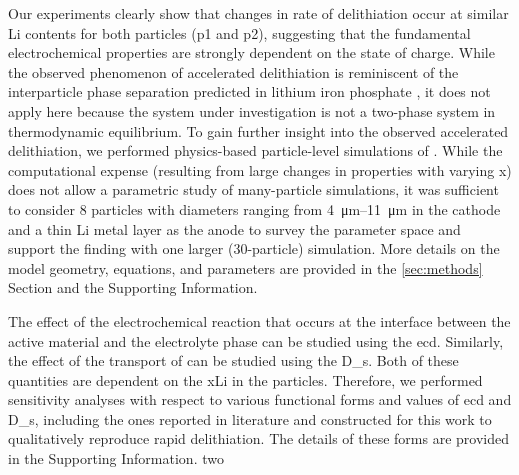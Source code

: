\documentclass{article}
\begin{document}
Our experiments clearly show that changes in rate of delithiation
occur at similar Li contents for both particles (\gls{p1} and
\gls{p2}), suggesting that the fundamental electrochemical properties
are strongly dependent on the state of charge. While the observed
phenomenon of accelerated delithiation is reminiscent of the
interparticle phase separation predicted in lithium iron phosphate
, it does not apply here because the system under
investigation is not a two-phase system in thermodynamic
equilibrium. To gain further insight into the observed accelerated
delithiation, we performed physics-based particle-level simulations of
. While the computational expense (resulting from large changes
in properties with varying x) does not allow a parametric study of
many-particle simulations, it was sufficient to consider 8 particles
with diameters ranging from \SIrange{4}{11}{\micro\meter} in the
cathode and a thin Li metal layer as the anode to survey the parameter
space and support the finding with one larger (30-particle)
simulation. More details on the model geometry, equations, and
parameters are provided in the \ref{sec:methods} Section and the
Supporting Information.

The effect of the electrochemical reaction that occurs at the
interface between the active material and the electrolyte phase can be
studied using the \gls{ecd}. Similarly, the effect of the transport of
 can be studied using the \gls{D_s}. Both of these quantities
are dependent on the \gls{xLi} in the particles. Therefore, we
performed sensitivity analyses with respect to various functional
forms and values of \gls{ecd} and \gls{D_s}, including the ones
reported in literature and constructed for this work to qualitatively
reproduce rapid delithiation. The details of these forms are provided
in the Supporting Information. %
two
\end{document}
